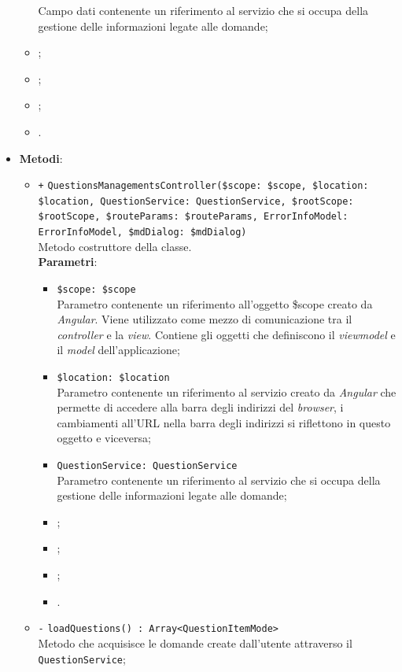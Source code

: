 \begin{itemize}
\begin{itemize}
		Campo dati contenente un riferimento al servizio che si occupa della gestione delle informazioni legate alle domande;
		\item \rootscopeA;
		\item \routeparamsA;
		\item \errorinfomodelA;
		\item \mddialogA.
	\end{itemize}
	\item \textbf{Metodi}:
	\begin{itemize}
		\item \texttt{+} \texttt{QuestionsManagementsController(\$scope: \$scope, \$location: \$location, QuestionService: QuestionService, \$rootScope: \$rootScope, \$routeParams: \$routeParams, ErrorInfoModel: ErrorInfoModel, \$mdDialog: \$mdDialog)} \\ 
		Metodo costruttore della classe. \\
		\textbf{Parametri}:
		\begin{itemize}
			\item \texttt{\$scope: \$scope} \\
			Parametro contenente un riferimento all'oggetto \$scope creato da \textit{Angular}. Viene utilizzato come mezzo di comunicazione tra il \textit{controller} e la \textit{view}. Contiene gli oggetti che definiscono il \textit{viewmodel} e il \textit{model} dell'applicazione;
			\item \texttt{\$location: \$location} \\
			Parametro contenente un riferimento al servizio creato da \textit{Angular} che permette di accedere alla barra degli indirizzi del \textit{browser}, i cambiamenti all'URL nella barra degli indirizzi si riflettono in questo oggetto e viceversa;
			\item \texttt{QuestionService: QuestionService} \\
			Parametro contenente un riferimento al servizio che si occupa della gestione delle informazioni legate alle domande;
			\item \rootscopeP;
			\item \routeparamsP;
			\item \errorinfomodelP;
			\item \mddialogP. 
		\end{itemize}
		\item \texttt{-} \texttt{loadQuestions() : Array<QuestionItemMode>} \\ 
		Metodo che acquisisce le domande create dall'utente attraverso il \texttt{QuestionService};\\

\end{itemize}
\end{itemize}
